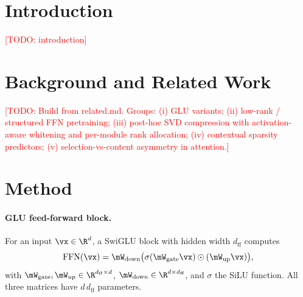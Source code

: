 \documentclass{article}
\newcommand{\todo}[1]{\textcolor{red}{[TODO: #1]}}
\begin{document}
\section{Introduction}
\todo{introduction}

\section{Background and Related Work}
\todo{Build from related.md. Groups: (i) GLU variants; (ii) low-rank / structured FFN pretraining;
(iii) post-hoc SVD compression with activation-aware whitening and per-module rank allocation;
(iv) contextual sparsity predictors; (v) selection-vs-content asymmetry in attention.}

\section{Method}
\label{sec:method}

\paragraph{GLU feed-forward block.} For an input $\vx \in \R^{d}$, a SwiGLU block with hidden width
$d_{\mathrm{ff}}$ computes
\begin{equation}
  \mathrm{FFN}(\vx) = \mW_{\mathrm{down}} \big( \sigma(\mW_{\mathrm{gate}} \vx) \odot (\mW_{\mathrm{up}} \vx) \big),
\end{equation}
with $\mW_{\mathrm{gate}}, \mW_{\mathrm{up}} \in \R^{d_{\mathrm{ff}} \times d}$,
$\mW_{\mathrm{down}} \in \R^{d \times d_{\mathrm{ff}}}$, and $\sigma$ the SiLU function. All three matrices
have $d \, d_{\mathrm{ff}}$ parameters.
\end{document}
